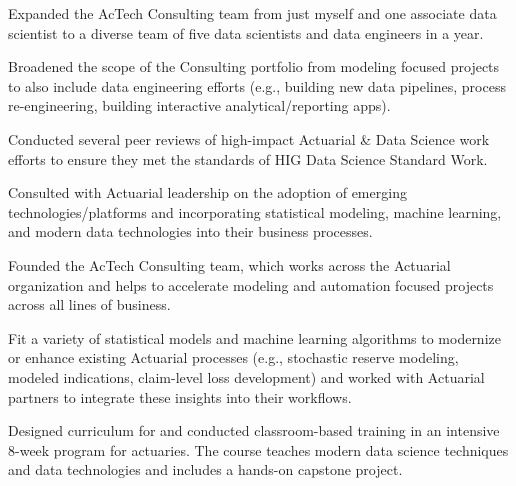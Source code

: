 \documentclass[letterpaper]{deedy-resume} %
\begin{document}
\begin{minipage}[t]{0.68\textwidth}
  \hfill
  \begin{tightitemize}
  \item  Expanded the AcTech Consulting team from just myself and one
    associate data scientist to a diverse team of five data scientists
    and data engineers in a year. 
  \item Broadened the scope of the Consulting portfolio from modeling focused projects to
    also include data engineering efforts (e.g., building new data
    pipelines, process re-engineering, building interactive
    analytical/reporting apps).
  \item Conducted several peer reviews of high-impact Actuarial \&
    Data Science work efforts to ensure they met the standards of HIG
   Data Science Standard Work.
  \item Consulted with Actuarial leadership on the adoption of emerging
    technologies/platforms and incorporating statistical modeling,
    machine learning, and modern data technologies into their business
    processes.
  \end{tightitemize}
  \sectionspace

  \hfill
  \begin{tightitemize}
  \item   Founded the AcTech Consulting team, which works across the Actuarial
    organization and helps to accelerate modeling and automation
    focused projects across all lines of business. 
  \item Fit a variety of statistical models and machine learning
    algorithms to modernize or enhance existing Actuarial processes
    (e.g., stochastic reserve modeling, modeled indications, claim-level
    loss development) and worked with Actuarial partners to integrate
    these insights into their workflows.
  \item Designed curriculum for and conducted classroom-based training in an
    intensive 8-week program for actuaries. The course teaches modern data
    science techniques and data technologies and includes a hands-on
    capstone project.
  \end{tightitemize}
  \sectionspace

  


\end{minipage} %
\newpage
\end{document}
